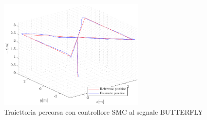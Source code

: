 \begin{figure}
	\centering
	\includegraphics[width=0.65\textwidth]{Simulazioni/Figure/SMC/BUTTERFLY/Trajectory}
	\caption{Traiettoria percorsa con controllore SMC al segnale BUTTERFLY}
	\label{fig:BUTTERFLYtraSMC}
\end{figure}


